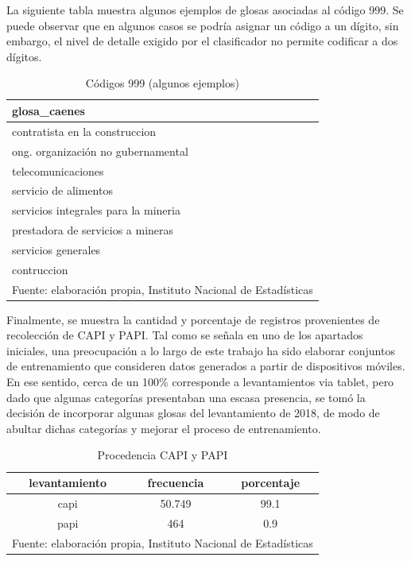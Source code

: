 \documentclass[
  12pt,
  spanish,
]{article}
\begin{document}
La siguiente tabla muestra algunos ejemplos de glosas asociadas al
código 999. Se puede observar que en algunos casos se podría asignar un
código a un dígito, sin embargo, el nivel de detalle exigido por el
clasificador no permite codificar a dos dígitos.

\begin{table}[H]

\caption{\label{tab:glosas 999}\label{cod_999_caenes}Códigos 999 (algunos ejemplos)}
\centering
\fontsize{9.5}{11.5}\selectfont
\begin{tabular}[t]{l}
\toprule
glosa\_caenes\\
\midrule
contratista en la construccion\\
ong. organización no gubernamental\\
telecomunicaciones\\
servicio de alimentos\\
servicios integrales para la mineria\\
\addlinespace
prestadora de servicios a mineras\\
servicios generales\\
contruccion\\
\bottomrule
\multicolumn{1}{l}{\rule{0pt}{1em}Fuente: elaboración propia, Instituto Nacional de Estadísticas }\\
\end{tabular}
\end{table}

Finalmente, se muestra la cantidad y porcentaje de registros
provenientes de recolección de CAPI y PAPI. Tal como se señala en uno de
los apartados iniciales, una preocupación a lo largo de este trabajo ha
sido elaborar conjuntos de entrenamiento que consideren datos generados
a partir de dispositivos móviles. En ese sentido, cerca de un 100\%
corresponde a levantamientos via tablet, pero dado que algunas
categorías presentaban una escasa presencia, se tomó la decisión de
incorporar algunas glosas del levantamiento de 2018, de modo de abultar
dichas categorías y mejorar el proceso de entrenamiento.

\begin{table}[H]

\caption{\label{tab:unnamed-chunk-1}\label{capi_papi}Procedencia CAPI y PAPI}
\centering
\fontsize{9.5}{11.5}\selectfont
\begin{tabular}[t]{ccc}
\toprule
levantamiento & frecuencia & porcentaje\\
\midrule
capi & 50.749 & 99.1\\
papi & 464 & 0.9\\
\bottomrule
\multicolumn{3}{l}{\rule{0pt}{1em}Fuente: elaboración propia, Instituto Nacional de Estadísticas }\\
\end{tabular}
\end{table}
\end{document}
